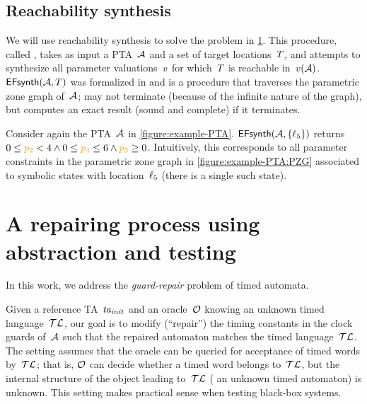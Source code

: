 \begin{tikzborder}{\cite{Gargantini16:validation}}
\begin{tikzborder}{\cite{gargantini_combinatorial_2017}}
\begin{tikzborder}{\cite{garn2019}}
\begin{tikzborder}{\cite{arcaini2019achieving}}
\begin{tikzborder}{\cite{arcaini2019varivolution}}
\subsection{Reachability synthesis}

\begin{tikzborder}{}
We will use reachability synthesis to solve the problem in \ref{sec:proposedApproachSingle}.
This procedure, called \EFsynth{}, takes as input a PTA~$\mathcal{A}$ and a set of target locations~$T$, and attempts to synthesize all parameter valuations~$v$ for which~$T$ is reachable in~$v(\mathcal{A})$.
$\textsf{EFsynth}(\mathcal{A}, T)$ was formalized in \eg{} \cite{JLR15} and is a procedure that traverses the parametric zone graph of~$\mathcal{A}$;
\EFsynth{} may not terminate (because of the infinite nature of the graph), but computes an exact result (sound and complete) if it terminates.


\begin{example}
	Consider again the PTA~$\mathcal{A}$ in \ref{figure:example-PTA}.
	$\textsf{EFsynth}(\mathcal{A}, \{ \ell_5 \})$ returns $0 \leq \parami{2} < 4 \land 0 \leq \parami{4} \leq 6 \land \parami{3} \geq 0$.
	Intuitively, this corresponds to all parameter constraints in the parametric zone graph in \ref{figure:example-PTA:PZG} associated to symbolic states with location~$\ell_5$ (there is a single such state).
\end{example}
\end{tikzborder}

\section{A repairing process using abstraction and testing}\label{sec:proposedApproachSingle}

In this work, we address the \emph{guard-repair} problem of timed automata.

\bb
Given a reference TA~$\mathit{ta_{init}}$ and an oracle~$\mathcal{O}$ knowing an unknown timed language~$\mathcal{TL}$, our goal is to modify (``repair'') the timing constants in the clock guards of~$\mathcal{A}$ such that the repaired automaton matches the timed language~$\mathcal{TL}$.
%
The setting assumes that the oracle \oracleTa can be queried for acceptance of timed words by~$\mathcal{TL}$; that is, $\mathcal{O}$ can decide whether a timed word belongs to~$\mathcal{TL}$, but the internal structure of the object leading to~$\mathcal{TL}$ (\eg{} an unknown timed automaton) is unknown.
%
This setting makes practical sense when testing black-box systems.


\end{tikzborder}
\end{tikzborder}
\end{tikzborder}
\end{tikzborder}
\end{tikzborder}
